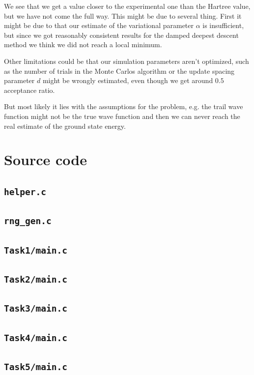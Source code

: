 We see that we get a value closer to the experimental one than the Hartree value, but we have not come the full way. This might be due to several thing. First it might be due to that our estimate of the variational parameter $\alpha$ is insufficient, but since we got reasonably consistent results for the damped deepest descent method we think we did not reach a local minimum. 

Other limitations could be that our simulation parameters aren't optimized, such as the number of trials in the Monte Carlos algorithm or the update spacing parameter $d$ might be wrongly estimated, even though we get around $0.5$ acceptance ratio. 

But most likely it lies with the assumptions for the problem, e.g. the trail wave function might not be the true wave function and then we can never reach the real estimate of the ground state energy.






\appendix
\section{Source code}
\subsection{\texttt{helper.c}}


\subsection{\texttt{rng\_gen.c}}


\subsection{\texttt{Task1/main.c}}


\subsection{\texttt{Task2/main.c}}


\subsection{\texttt{Task3/main.c}}


\subsection{\texttt{Task4/main.c}}


\subsection{\texttt{Task5/main.c}}




